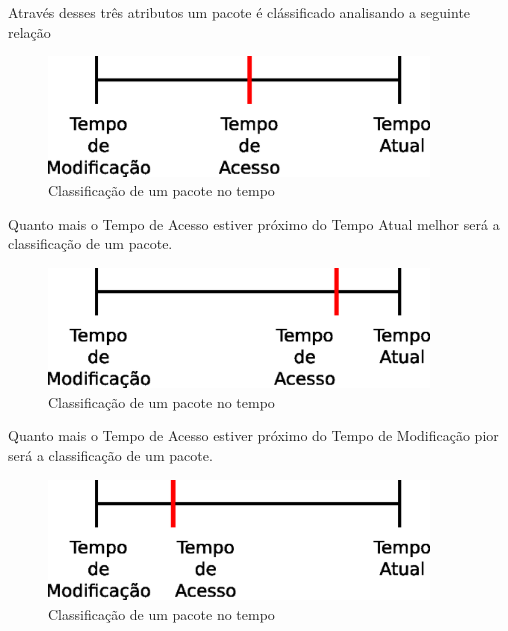 \begin{frame}

    Através desses três atributos um pacote é clássificado analisando
a seguinte relação

    \begin{figure}[h]
      \centering
      \includegraphics[width=0.9\textwidth]{figura/barra_temporal_01.eps}
      \caption{Classificação de um pacote no tempo}
      \label{fig:barra_temporal}
    \end{figure}

\end{frame}


\begin{frame}

    Quanto mais o Tempo de Acesso estiver próximo do Tempo Atual
melhor será a classificação de um pacote.
    \begin{figure}[h]
      \centering
      \includegraphics[width=0.9\textwidth]{figura/barra_temporal_02.eps}
      \caption{Classificação de um pacote no tempo}
      \label{fig:barra_temporal}
    \end{figure}

\end{frame}


\begin{frame}

    Quanto mais o Tempo de Acesso estiver próximo do Tempo de Modificação
pior será a classificação de um pacote.
    \begin{figure}[h]
      \centering
      \includegraphics[width=0.9\textwidth]{figura/barra_temporal_03.eps}
      \caption{Classificação de um pacote no tempo}
      \label{fig:barra_temporal}
    \end{figure}

\end{frame}


